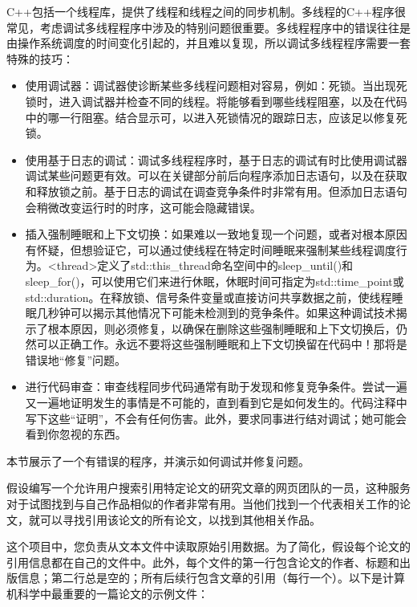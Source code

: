 
C++包括一个线程库，提供了线程和线程之间的同步机制。多线程的C++程序很常见，考虑调试多线程程序中涉及的特别问题很重要。多线程程序中的错误往往是由操作系统调度的时间变化引起的，并且难以复现，所以调试多线程程序需要一套特殊的技巧：

\begin{itemize}
\item
使用调试器：调试器使诊断某些多线程问题相对容易，例如：死锁。当出现死锁时，进入调试器并检查不同的线程。将能够看到哪些线程阻塞，以及在代码中的哪一行阻塞。结合显示可，以进入死锁情况的跟踪日志，应该足以修复死锁。

\item
使用基于日志的调试：调试多线程程序时，基于日志的调试有时比使用调试器调试某些问题更有效。可以在关键部分前后向程序添加日志语句，以及在获取和释放锁之前。基于日志的调试在调查竞争条件时非常有用。但添加日志语句会稍微改变运行时的时序，这可能会隐藏错误。

\item
插入强制睡眠和上下文切换：如果难以一致地复现一个问题，或者对根本原因有怀疑，但想验证它，可以通过使线程在特定时间睡眠来强制某些线程调度行为。<thread>定义了std::this\_thread命名空间中的sleep\_until()和sleep\_for()，可以使用它们来进行休眠，休眠时间可指定为std::time\_point或std::duration。在释放锁、信号条件变量或直接访问共享数据之前，使线程睡眠几秒钟可以揭示其他情况下可能未检测到的竞争条件。如果这种调试技术揭示了根本原因，则必须修复，以确保在删除这些强制睡眠和上下文切换后，仍然可以正确工作。永远不要将这些强制睡眠和上下文切换留在代码中！那将是错误地“修复”问题。

\item
进行代码审查：审查线程同步代码通常有助于发现和修复竞争条件。尝试一遍又一遍地证明发生的事情是不可能的，直到看到它是如何发生的。代码注释中写下这些“证明”，不会有任何伤害。此外，要求同事进行结对调试；她可能会看到你忽视的东西。
\end{itemize}


本节展示了一个有错误的程序，并演示如何调试并修复问题。

假设编写一个允许用户搜索引用特定论文的研究文章的网页团队的一员，这种服务对于试图找到与自己作品相似的作者非常有用。当他们找到一个代表相关工作的论文，就可以寻找引用该论文的所有论文，以找到其他相关作品。

这个项目中，您负责从文本文件中读取原始引用数据。为了简化，假设每个论文的引用信息都在自己的文件中。此外，每个文件的第一行包含论文的作者、标题和出版信息；第二行总是空的；所有后续行包含文章的引用（每行一个）。以下是计算机科学中最重要的一篇论文的示例文件：

